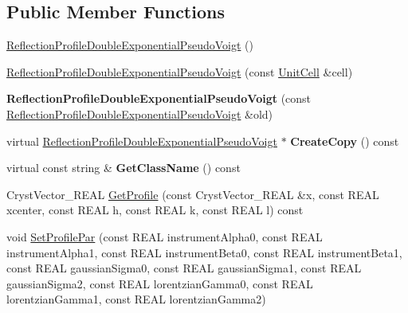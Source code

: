 \subsection*{Public Member Functions}
\begin{DoxyCompactItemize}
\item 
\mbox{\hyperlink{class_obj_cryst_1_1_reflection_profile_double_exponential_pseudo_voigt_a99d69f5a755094081165c27f8cbc0de2}{Reflection\+Profile\+Double\+Exponential\+Pseudo\+Voigt}} ()
\item 
\mbox{\hyperlink{class_obj_cryst_1_1_reflection_profile_double_exponential_pseudo_voigt_a83ca292045467ce5ca2fd5f33f60082b}{Reflection\+Profile\+Double\+Exponential\+Pseudo\+Voigt}} (const \mbox{\hyperlink{class_obj_cryst_1_1_unit_cell}{Unit\+Cell}} \&cell)
\item 
\mbox{\label{class_obj_cryst_1_1_reflection_profile_double_exponential_pseudo_voigt_ae4b01c3514699b3ca8981776afd11010}} 
{\bfseries Reflection\+Profile\+Double\+Exponential\+Pseudo\+Voigt} (const \mbox{\hyperlink{class_obj_cryst_1_1_reflection_profile_double_exponential_pseudo_voigt}{Reflection\+Profile\+Double\+Exponential\+Pseudo\+Voigt}} \&old)
\item 
\mbox{\label{class_obj_cryst_1_1_reflection_profile_double_exponential_pseudo_voigt_a3538777730c86ecabd5856dcf338b705}} 
virtual \mbox{\hyperlink{class_obj_cryst_1_1_reflection_profile_double_exponential_pseudo_voigt}{Reflection\+Profile\+Double\+Exponential\+Pseudo\+Voigt}} $\ast$ {\bfseries Create\+Copy} () const
\item 
\mbox{\label{class_obj_cryst_1_1_reflection_profile_double_exponential_pseudo_voigt_ac89aa319f201156a0cb65e571746c2c8}} 
virtual const string \& {\bfseries Get\+Class\+Name} () const
\item 
Cryst\+Vector\+\_\+\+R\+E\+AL \mbox{\hyperlink{class_obj_cryst_1_1_reflection_profile_double_exponential_pseudo_voigt_a4673785fae1ffdcc0a9c2402e8c4af8b}{Get\+Profile}} (const Cryst\+Vector\+\_\+\+R\+E\+AL \&x, const R\+E\+AL xcenter, const R\+E\+AL h, const R\+E\+AL k, const R\+E\+AL l) const
\item 
void \mbox{\hyperlink{class_obj_cryst_1_1_reflection_profile_double_exponential_pseudo_voigt_a056c4179927ced1e55e3529fe54696f6}{Set\+Profile\+Par}} (const R\+E\+AL instrument\+Alpha0, const R\+E\+AL instrument\+Alpha1, const R\+E\+AL instrument\+Beta0, const R\+E\+AL instrument\+Beta1, const R\+E\+AL gaussian\+Sigma0, const R\+E\+AL gaussian\+Sigma1, const R\+E\+AL gaussian\+Sigma2, const R\+E\+AL lorentzian\+Gamma0, const R\+E\+AL lorentzian\+Gamma1, const R\+E\+AL lorentzian\+Gamma2)

\end{DoxyCompactItemize}
